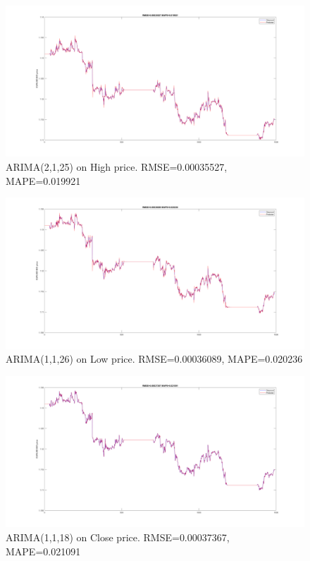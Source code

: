 \documentclass[11pt]{article}
\begin{document}
\begin{figure}[H]
  \centering
  \includegraphics[width=\linewidth,keepaspectratio]{figs/arima_2_1_25_high.png}
  \caption{ARIMA(2,1,25) on High price. RMSE=0.00035527, MAPE=0.019921}
\end{figure}

\begin{figure}[H]
  \centering
  \includegraphics[width=\linewidth,keepaspectratio]{figs/arima_26_1_1_low.png}
  \caption{ARIMA(1,1,26) on Low price. RMSE=0.00036089, MAPE=0.020236}
\end{figure}

\begin{figure}[H]
  \centering
  \includegraphics[width=\linewidth,keepaspectratio]{figs/arima_1_1_18_close.png}
  \caption{ARIMA(1,1,18) on Close price. RMSE=0.00037367, MAPE=0.021091}
\end{figure}
\end{document}
